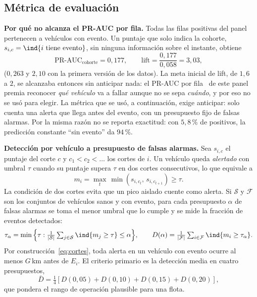 \subsection{Métrica de evaluación}
\label{sec:metricas}

\textbf{Por qué no alcanza el PR-AUC por fila.} Todas las filas positivas del panel pertenecen a vehículos con evento. Un puntaje que solo
indica la cohorte, $s_{i,c} = \ind\{i \text{ tiene evento}\}$, sin ninguna información sobre el instante, obtiene
\begin{equation}
  \text{PR-AUC}_{\text{cohorte}} = 0{,}177, \qquad \text{lift} = \frac{0{,}177}{0{,}058} = 3{,}03,
  \label{eq:techo}
\end{equation}
($0{,}263$ y $2{,}10$ con la primera versión de los datos). La meta inicial de lift, de $1{,}6$ a $2$, se alcanzaba entonces sin anticipar
nada: el PR-AUC por fila~\cite{saito2015} de este panel premia reconocer \emph{qué vehículo} va a fallar aunque no se sepa
\emph{cuándo}, y por eso no se usó para elegir. La métrica que se usó, a continuación, exige anticipar: solo cuenta una
alerta que llega antes del evento, con un presupuesto fijo de falsas alarmas. Por la misma razón no se reporta exactitud:
con $5{,}8\,\%$ de positivos, la predicción constante ``sin evento'' da $94\,\%$.

\textbf{Detección por vehículo a presupuesto de falsas alarmas.} Sea $s_{i,c}$ el puntaje del corte $c$ y $c_1 < c_2 < \dots$
los cortes de $i$. Un vehículo queda \emph{alertado} con umbral $\tau$ cuando su puntaje supera $\tau$ en dos cortes
consecutivos, lo que equivale a
\begin{equation}
  m_i = \max_{t}\, \min\!\left(s_{i,c_t},\, s_{i,c_{t+1}}\right) \ge \tau .
  \label{eq:alerta}
\end{equation}
La condición de dos cortes evita que un pico aislado cuente como alerta. Si $\mathcal{S}$ y $\mathcal{F}$ son los
conjuntos de vehículos sanos y con evento, para cada presupuesto $\alpha$ de falsas alarmas se toma el menor umbral que lo
cumple y se mide la fracción de eventos detectados:
\begin{equation}
  \tau_\alpha = \min\Big\{\tau : \tfrac{1}{|\mathcal{S}|}\textstyle\sum_{j\in\mathcal{S}} \ind\{m_j \ge \tau\} \le \alpha\Big\},
  \qquad
  D(\alpha) = \frac{1}{|\mathcal{F}|}\sum_{i\in\mathcal{F}} \ind\{m_i \ge \tau_\alpha\}.
  \label{eq:deteccion}
\end{equation}
Por construcción~\eqref{eq:cortes}, toda alerta en un vehículo con evento ocurre al menos $G$\,km antes de $E_i$. El
criterio primario es la detección media en cuatro presupuestos,
\begin{equation}
  \bar D = \tfrac14\left[ D(0{,}05) + D(0{,}10) + D(0{,}15) + D(0{,}20) \right],
  \label{eq:primario}
\end{equation}
que pondera el rango de operación plausible para una flota.

